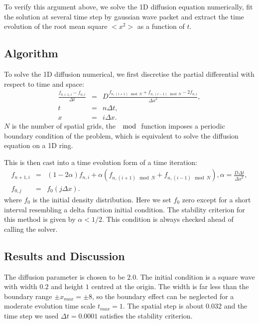 \documentclass[a4paper,12pt]{article}
\begin{document}
To verify this argument above, we solve the 1D diffusion equation numerically, fit the solution at several time step by gaussian wave packet and extract the time evolution of the root mean square $<x^2>$ as a function of $t$.

\subsection{Algorithm}
To solve the 1D diffusion numerical, we first discretise the partial differential with respect to time and space:
\begin{eqnarray*}
\frac{f_{n+1,i}-f_{n,i}}{\Delta t}  &=& D\frac{f_{n,(i+1)\mod N}+f_{n,(i-1)\mod N} - 2 f_{n,i}}{{\Delta x}^2},\\
t &=& n \Delta t, \\
x &=& i \Delta x.
\end{eqnarray*}
$N$ is the number of spatial grids, the $\mod$ function imposes a periodic boundary condition of the problem, which is equivalent to solve the diffusion equation on a 1D ring.

This is then cast into a time evolution form of a time iteration:
\begin{eqnarray*}
f_{n+1,i} &=&  (1 - 2 \alpha) f_{n,i} + \alpha (f_{n, (i+1)\mod N}+f_{n, (i-1)\mod N}), \alpha = \frac{D\Delta t}{{\Delta x}^2},\\
f_{0,j} &=& f_0(j\Delta x).
\end{eqnarray*}
where $f_0$ is the initial density distribution. Here we set $f_0$ zero except for a short interval resembling a delta function initial condition. The stability criterion for this method is given by $\alpha < 1/2$. This condition is always checked ahead of calling the solver. 

\subsection{Results and Discussion}
The diffusion parameter is chosen to be $2.0$. The initial condition is a square wave with width $0.2$ and height $1$ centred at the origin. The width is far less than the boundary range $\pm x_{max} = \pm 8$, so the boundary effect can be neglected for a moderate evolution time scale $t_{max} = 1$. The spatial step is about 0.032 and the time step we used $\Delta t = 0.0001$ satisfies the stability criterion.
\end{document}
